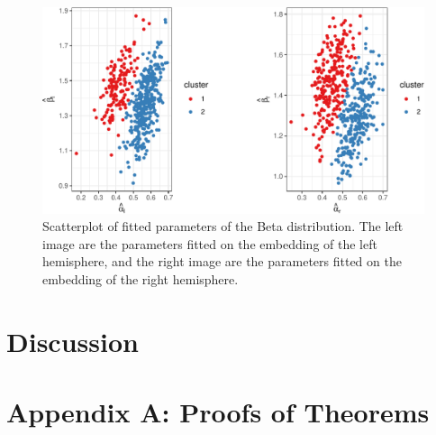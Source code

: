 \documentclass[12pt]{article}
\begin{document}
\begin{figure}[H]

{\centering \includegraphics{draft_files/figure-latex/hcp-clustering-1} 

}

\caption{Scatterplot of fitted parameters of the Beta distribution. The left image are the parameters fitted on the embedding of the left hemisphere, and the right image are the parameters fitted on the embedding of the right hemisphere.}\label{fig:hcp-clustering}
\end{figure}

\section{Discussion}\label{discussion}

\section*{Appendix A: Proofs of Theorems}

\newpage


\renewcommand\refname{Bibliography}

\end{document}
